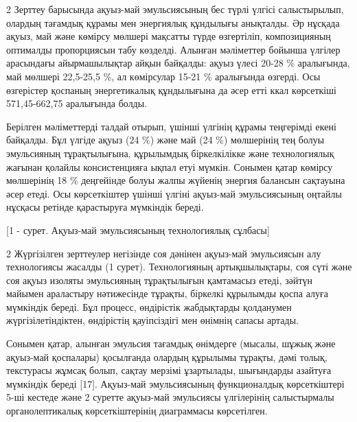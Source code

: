 \begin{multicols}{2}
Зерттеу барысында ақуыз-май эмульсиясының бес түрлі үлгісі салыстырылып,
олардың тағамдық құрамы мен энергиялық құндылығы анықталды. Әр нұсқада
ақуыз, май және көмірсу мөлшері мақсатты түрде өзгертіліп, композицияның
оптималды пропорциясын табу көзделді. Алынған мәліметтер бойынша үлгілер
арасындағы айырмашылықтар айқын байқалды: ақуыз үлесі 20-28 \%
аралығында, май мөлшері 22,5-25,5 \%, ал көмірсулар 15-21 \% аралығында
өзгерді. Осы өзгерістер қоспаның энергетикалық құндылығына да әсер етті
ккал көрсеткіші 571,45-662,75 аралығында болды.

Берілген мәліметтерді талдай отырып, үшінші үлгінің құрамы теңгерімді
екені байқалды. Бұл үлгіде ақуыз (24 \%) және май (24 \%) мөлшерінің тең
болуы эмульсияның тұрақтылығына, құрылымдық біркелкілікке және
технологиялық жағынан қолайлы консистенцияға ықпал етуі мүмкін. Сонымен
қатар көмірсу мөлшерінің 18 \% деңгейінде болуы жалпы жүйенің энергия
балансын сақтауына әсер етеді. Осы көрсеткіштер үшінші үлгіні ақуыз-май
эмульсиясының оңтайлы нұсқасы ретінде қарастыруға мүмкіндік береді.
\end{multicols}

[1 - сурет. Ақуыз-май эмульсиясының технологиялық сұлбасы]

\begin{multicols}{2}
Жүргізілген зерттеулер негізінде соя дәнінен ақуыз-май эмульсиясын алу
технологиясы жасалды (1 сурет). Технологияның артықшылықтары, соя сүті
және соя ақуыз изоляты эмульсияның тұрақтылығын қамтамасыз етеді, зәйтүн
майымен араластыру нәтижесінде тұрақты, біркелкі құрылымды қоспа алуға
мүмкіндік береді. Бұл процесс, өндірістік жабдықтарды қолданумен
жүргізілетіндіктен, өндірістің қауіпсіздігі мен өнімнің сапасы артады.

Сонымен қатар, алынған эмульсия тағамдық өнімдерге (мысалы, шұжық және
ақуыз-май қоспалары) қосылғанда олардың құрылымы тұрақты, дәмі толық,
текстурасы жұмсақ болып, сақтау мерзімі ұзартылады, шығындарды азайтуға
мүмкіндік береді {[}17{]}. Ақуыз-май эмульсиясының функционалдық
көрсеткіштері 5-ші кестеде және 2 суретте ақуыз-май эмульсиясы
үлгілерінің салыстырмалы органолептикалық көрсеткіштерінің диаграммасы
көрсетілген.
\end{multicols}

